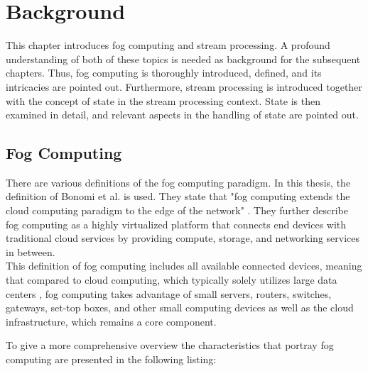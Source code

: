 \section{Background}
\label{lBackground}
This chapter introduces fog computing and stream processing. A profound understanding of both of these topics is needed as background for the subsequent chapters. Thus, fog computing is thoroughly introduced, defined, and its intricacies are pointed out. Furthermore, stream processing is introduced together with the concept of state in the stream processing context. State is then examined in detail, and relevant aspects in the handling of state are pointed out.

\subsection{Fog Computing}
\label{lFogComputing}
There are various definitions of the fog computing paradigm. In this thesis, the definition of Bonomi et al. \cite{Bonomi.2012} is used. They state that "fog computing extends the cloud computing paradigm to the edge of the network" \cite{Bonomi.2012}. They further describe fog computing as a highly virtualized platform that connects end devices with traditional cloud services by providing compute, storage, and networking services in between.\\
This definition of fog computing includes all available connected devices, meaning that compared to cloud computing, which typically solely utilizes large data centers \cite{Yousefpour.2019}, fog computing takes advantage of small servers, routers, switches, gateways, set-top boxes, and other small computing devices \cite{Yousefpour.2019} as well as the cloud infrastructure, which remains a core component.\par
To give a more comprehensive overview the characteristics that portray fog computing are presented in the following listing: 

